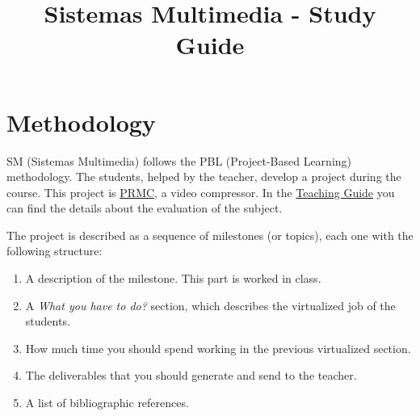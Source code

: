 \title{Sistemas Multimedia - Study Guide}

\maketitle

\section{Methodology}
SM (Sistemas Multimedia) follows the PBL (Project-Based Learning)
methodology. The students, helped by the teacher, develop a project
during the course. This project is
\href{https://github.com/Sistemas-Multimedia/PRMC}{PRMC}, a video
compressor. In the
\href{http://portafirma.ual.es/pfirma/downloadReport/file?idDocument=Y3iGKKA5Lb&idRequest=vo8X8SLOXQ}{Teaching
  Guide} you can find the details about the evaluation of the subject.

The project is described as a sequence of milestones (or topics), each
one with the following structure:
\begin{enumerate}
\item A description of the milestone. This part is worked in class.
\item A \emph{What you have to do?} section, which describes the
  virtualized job of the students.
\item How much time you should spend working in the previous
  virtualized section.
\item The deliverables that you should generate and send to the
  teacher.
\item A list of bibliographic references.
\end{enumerate}

